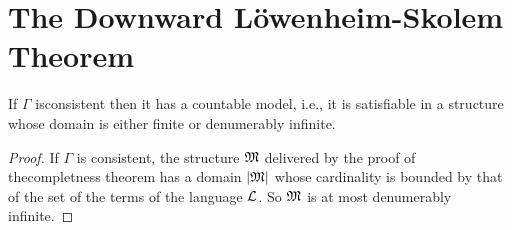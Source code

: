 \documentclass[open-logic-section]{subfiles}
\begin{document}
\section{The Downward L\"owenheim-Skolem Theorem}

\begin{prop} If $\Gamma$
  isconsistent then it has a countable model, i.e., it is satisfiable
  in a structure whose domain is either finite or denumerably infinite.
\end{prop}

\begin{proof}
  If $\Gamma$ is consistent, the structure $\mathfrak M$ delivered by
  the proof of thecompletness theorem has a domain $\left| \mathfrak M \right|$ whose
  cardinality is bounded by that of the set of the terms of the
  language $\mathcal L$. So $\mathfrak M$ is at most denumerably infinite.
\end{proof}
\end{document}
